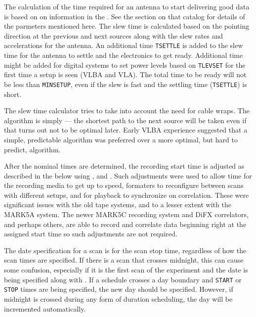\documentclass{report}
\begin{document}
The calculation of the time required for an antenna to start delivering
good data is based on on information in the
.  See the section on that catalog
for details of the parmeters mentioned here.  The slew time is calculated
based on the pointing direction at the previous and next sources along
with the slew rates and accelerations for the antenna.  An additional
time {\tt TSETTLE} is added to the slew time for
the antenna to settle and the electronics to get ready.  Additional
time might be added for digital systems to set power levels based
on {\tt TLEVSET} for the first time a setup is seen (VLBA and VLA).
The total time to be ready will not be less than {\tt MINSETUP}, even if
the slew is fast and the settling time ({\tt TSETTLE}) is short.  

The slew time calculator tries to take into account the need for cable
wraps.  The algorithm is simply --- the shortest path to the next
source will be taken even if that turns out not to be optimal later.
Early VLBA experience suggested that a simple, predictable algorithm
was preferred over a more optimal, but hard to predict, algorithm.

After the nominal times are determined, the recording start time is
adjusted as described in the  below using , and .
Such adjustments were used to allow time for the recording media to
get up to speed, formaters to reconfigure between scans with different
setups, and for playback to synchronize on correlation.  These were
significant issues with the old tape systems, and to a lesser extent
with the MARK5A system.  The newer MARK5C recording system and DiFX
correlators, and perhaps others, are able to record and correlate data
beginning right at the assigned start time so such adjustments are
not required.

The date specification for a scan is for the scan stop time,
regardless of how the scan times are specified.  If there is a scan
that crosses midnight, this can cause some confusion, especially if it
is the first scan of the experiment and the date is being specified
along with .  If a schedule crosses a
day boundary and {\tt START} or {\tt STOP} times are being specified,
the new day should be specified.  However, if midnight is crossed
during any form of duration scheduling, the day will be incremented
automatically.
\end{document}
